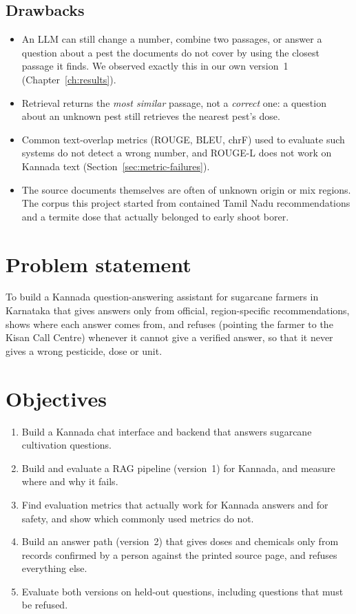 \subsection{Drawbacks}
\begin{itemize}
  \item An LLM can still change a number, combine two passages, or answer a question about
    a pest the documents do not cover by using the closest passage it finds. We observed
    exactly this in our own version~1 (Chapter~\ref{ch:results}).
  \item Retrieval returns the \emph{most similar} passage, not a \emph{correct} one: a
    question about an unknown pest still retrieves the nearest pest's dose.
  \item Common text-overlap metrics (ROUGE, BLEU, chrF) used to evaluate such systems do not
    detect a wrong number, and ROUGE-L does not work on Kannada text
    (Section~\ref{sec:metric-failures}).
  \item The source documents themselves are often of unknown origin or mix regions. The
    corpus this project started from contained Tamil Nadu recommendations and a termite
    dose that actually belonged to early shoot borer.
\end{itemize}

\section{Problem statement}
To build a Kannada question-answering assistant for sugarcane farmers in Karnataka that
gives answers only from official, region-specific recommendations, shows where each
answer comes from, and refuses (pointing the farmer to the Kisan Call Centre) whenever it
cannot give a verified answer, so that it never gives a wrong pesticide, dose or unit.

\section{Objectives}
\begin{enumerate}
  \item Build a Kannada chat interface and backend that answers sugarcane cultivation
    questions.
  \item Build and evaluate a RAG pipeline (version~1) for Kannada, and measure where and
    why it fails.
  \item Find evaluation metrics that actually work for Kannada answers and for safety, and
    show which commonly used metrics do not.
  \item Build an answer path (version~2) that gives doses and chemicals only from records
    confirmed by a person against the printed source page, and refuses everything else.
  \item Evaluate both versions on held-out questions, including questions that must be
    refused.
\end{enumerate}

